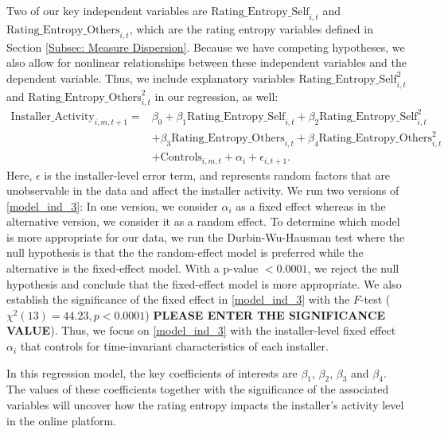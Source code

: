 \documentclass[msom,blindrev]{informs3}
\begin{document}
	Two of our key independent variables are $\text{Rating\_Entropy\_Self}_{i,t}$ and  $\text{Rating\_Entropy\_Others}_{i,t}$, which are the rating entropy variables defined in Section \ref{Subsec: Measure Dispersion}. Because we have competing hypotheses, we also allow for nonlinear relationships between these independent variables and the dependent variable. Thus, we include explanatory variables $\text{Rating\_Entropy\_Self}_{i,t}^{2}$ and $\text{Rating\_Entropy\_Others}_{i,t}^{2}$ in our regression, as well:
	\begin{align}  \nonumber
	\text{Installer\_Activity}_{i,m,t+1}=&\beta_{0}+\beta_{1} \text{Rating\_Entropy\_Self}_{i,t}+\beta_{2} \text{Rating\_Entropy\_Self}_{i,t}^ {2}
	\\ \nonumber
	&+\beta_{3} \text{Rating\_Entropy\_Others}_{i,t}  +\beta_{4}\text{Rating\_Entropy\_Others}_{i,t}^{2} \\ \label{model_ind_3}
	&+ \text{Controls}_{i,m,t}+ \alpha_{i} + \epsilon_{i,t+1}.
	\end{align}
	Here, $\epsilon$ is the installer-level error term, and represents random factors that are unobservable in the data and affect the installer activity.  We run two versions of \eqref{model_ind_3}: In one version, we consider $\alpha_{i}$ as a fixed effect whereas in the alternative version, we consider it as a random effect. To determine which model is more appropriate for our data, we run the Durbin-Wu-Hausman test where the null hypothesis is that the the random-effect model is preferred while the alternative is the fixed-effect model. With a p-value $<0.0001$, we reject the null hypothesis and conclude that the fixed-effect model is more appropriate. We also establish the significance of the fixed effect in \eqref{model_ind_3} with the $F$-test ( $\chi^{2}(13)=44.23,p<0.0001$) \textbf{PLEASE ENTER THE SIGNIFICANCE VALUE}). Thus, we focus on \eqref{model_ind_3} with the installer-level fixed effect $\alpha_{i}$ that controls for time-invariant characteristics of each installer.
	
	In this regression model, the key coefficients of interests are $\beta_{1}$, $\beta_{2}$, $\beta_{3}$ and $\beta_{4}$. The values of these coefficients together with the significance of the associated variables will uncover how the rating entropy impacts the installer's activity level in the online platform.
	
\end{document}
